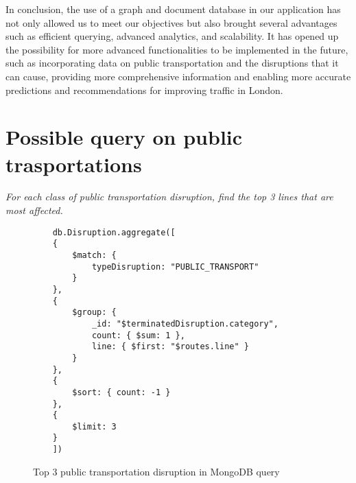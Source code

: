 In conclusion, the use of a graph and document database in our application has not only allowed us to meet our objectives but also brought several advantages such as efficient querying, advanced analytics, and scalability. It has opened up the possibility for more advanced functionalities to be implemented in the future, such as incorporating data on public transportation and the disruptions that it can cause, providing more comprehensive information and enabling more accurate predictions and recommendations for improving traffic in London.

\section{Possible query on public trasportations}

\textit{For each class of public transportation disruption, find the top 3  lines that are most affected.}

\begin{figure}[H]
	\begin{lstlisting}
	db.Disruption.aggregate([
	{
		$match: {
			typeDisruption: "PUBLIC_TRANSPORT"
		}
	},
	{
		$group: {
			_id: "$terminatedDisruption.category",
			count: { $sum: 1 },
			line: { $first: "$routes.line" }
		}
	},
	{
		$sort: { count: -1 }
	},
	{
		$limit: 3
	}
	])
	\end{lstlisting}
	\caption{Top 3 public transportation disruption in MongoDB query}
\end{figure}
